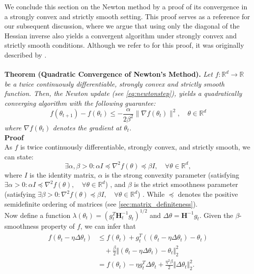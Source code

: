 We conclude this section on the Newton method by a proof of its convergence in a strongly convex and strictly smooth setting.
This proof serves as a reference for our subsequent discussion, where we argue that using only the diagonal of the Hessian inverse also yields
a convergent algorithm under strongly convex and strictly smooth conditions. Although  we refer to \cite{yao2021adahessian} for this proof,
it was originally described by \cite{boyd2004convex}.
\\\\
\noindent\textbf{Theorem (Quadratic Convergence of Newton's Method).} 
\textit{Let $f: \mathbb{R}^d \to \mathbb{R}$ be a twice continuously differentiable, strongly convex and strictly smooth function.
Then, the Newton update (see \ref{eq:newtonstep}),
yields a quadratically converging algorithm with the following guarantee:
\[ f(\theta_{t+1}) - f(\theta_t) \leq - \frac{\alpha}{2\beta^{2}} \|\nabla f(\theta_t)\|^2, \quad \theta  \in \mathbb{R}^d\]
where  $\nabla f(\theta_t)$ denotes the gradient at $\theta_t$.}
\vspace{1em}
\noindent\\\textbf{Proof}\\
As $f$ is twice continuously differentiable, strongly convex, and strictly smooth, we can state:
\begin{equation}
\label{eq:convex_smooth}
\exists \alpha, \beta > 0 : \alpha I \preceq \nabla^2 f(\theta) \preceq \beta I, \quad \forall \theta \in \mathbb{R}^d,
\end{equation}
where $I$ is the identity matrix, $\alpha$ is the strong convexity parameter
(satisfying $\exists \alpha > 0 : \alpha I \preceq \nabla^2 f(\theta), \quad \forall \theta \in \mathbb{R}^d$) \cite{convexity_smoothness},
and $\beta$ is the strict smoothness parameter (satisfying $\exists \beta > 0 : \nabla^2 f(\theta) \preceq \beta I, \quad \forall \theta \in \mathbb{R}^d$) \cite{convexity_smoothness}.
While $\preceq$ denotes the positive semidefinite ordering of matrices (see \ref{sec:matrix_definiteness}).\\
Now define a function $\lambda(\theta_t) = \left( g_t^T \mathbf{H}_t^{-1} g_t \right)^{1/2}$ and $
\Delta \theta = \mathbf{H}^{-1}g_t$.
Given the $\beta$-smoothness property of $f$, we can infer that 
\begin{align}
    \begin{split}
        f(\theta_t - \eta\Delta \theta_t) &\leq f(\theta_t) + g_t^T ((\theta_t - \eta\Delta \theta_t) - \theta_t) \\
        &\quad + \frac{\beta}{2} \Vert (\theta_t - \eta\Delta \theta_t) - \theta_t \Vert_2 ^2\\
        &= f(\theta_t) - \eta g_t^T \Delta \theta_t + \frac{\eta^2\beta}{2} \Vert \Delta \theta_t \Vert_2 ^2.
    \end{split}
\end{align}

